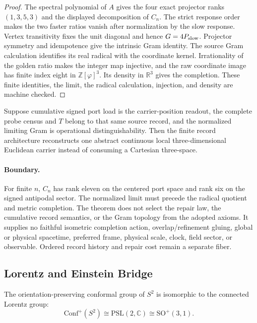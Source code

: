 \begin{proof}
The spectral polynomial of \(A\) gives the four exact projector ranks
\((1,3,5,3)\) and the displayed decomposition of \(C_n\). The strict response
order makes the two faster ratios vanish after normalization by the slow
response. Vertex transitivity fixes the unit diagonal and hence
\(G=4P_{\rm slow}\). Projector symmetry and idempotence give the intrinsic
Gram identity. The source Gram calculation identifies its real radical with
the coordinate kernel. Irrationality of the golden ratio makes the integer
map injective, and the raw coordinate image has finite index eight in
\(\mathbb Z[\varphi]^3\). Its density in \(\mathbb R^3\) gives the completion.
These finite identities, the limit, the radical calculation, injection, and
density are machine checked.
\end{proof}

\begin{corollary}
Suppose cumulative signed port load is the carrier-position readout, the
complete probe census and \(T\) belong to that same source record, and the
normalized limiting Gram is operational distinguishability. Then the finite
record architecture reconstructs one abstract continuous local
three-dimensional Euclidean carrier instead of consuming a Cartesian
three-space.
\end{corollary}

\paragraph{Boundary.}
For finite \(n\), \(C_n\) has rank eleven on the centered port space and rank
six on the signed antipodal sector. The normalized limit must precede the
radical quotient and metric completion. The theorem does not select the
repair law, the cumulative record semantics, or the Gram topology from the
adopted axioms. It supplies no faithful isometric completion action,
overlap/refinement gluing, global or physical spacetime, preferred frame,
physical scale, clock, field sector, or observable. Ordered record history
and repair cost remain a separate fiber.

\subsection{Lorentz and Einstein Bridge}

\begin{theorem}
The orientation-preserving conformal group of \(S^2\) is isomorphic to the connected Lorentz
group:
\[
\mathrm{Conf}^+(S^2)\cong \mathrm{PSL}(2,\mathbb C)\cong \mathrm{SO}^+(3,1).
\]
\end{theorem}

